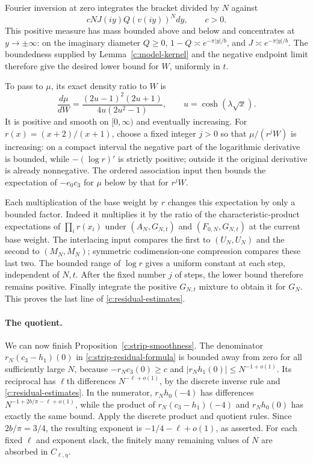 \documentclass[11pt]{article}
\numberwithin{equation}{section}
\theoremstyle{definition}\newtheorem{definition}[theorem]{Definition}
\theoremstyle{remark}\newtheorem{remark}[theorem]{Remark}
\begin{document}
Fourier inversion at zero integrates the bracket divided by $N$ against
\[
 cNJ(iy)Q(v(iy))^Ndy,\qquad c>0.
\]
This positive measure has mass bounded above and below and concentrates
at $y\to\pm\infty$: on the imaginary diameter $Q\ge0$,
$1-Q\asymp e^{-\pi|y|/b}$, and
$J\asymp e^{-\pi|y|/b}$.
The boundedness supplied by Lemma~\ref{c:model-kernel} and the negative
endpoint limit therefore give the desired lower bound for $W$,
uniformly in $t$.

To pass to $\mu$, its exact density ratio to $W$ is
\[
 \frac{d\mu}{dW}
 =\frac{(2u-1)^2(2u+1)}{4u(2u^2-1)},
 \qquad u=\cosh(\lambda\sqrt x).
\]
It is positive and smooth on $[0,\infty)$ and eventually increasing.
For $r(x)=(x+2)/(x+1)$, choose a fixed integer $j>0$ so that
$\mu/(r^jW)$ is increasing: on a compact interval the negative part
of the logarithmic derivative is bounded, while
$-(\log r)'$ is strictly positive; outside it the original derivative
is already nonnegative.  The ordered association input then bounds
the expectation of $-e_0c_3$ for $\mu$ below by that for $r^jW$.

Each multiplication of the base weight by $r$ changes this expectation
by only a bounded factor.  Indeed it multiplies it by the ratio of the
characteristic-product expectations of $\prod_i r(x_i)$ under
$(A_N,G_{N,t})$ and $(F_{0,N},G_{N,t})$ at the current base weight.
The interlacing input compares the first to $(U_N,U_N)$ and the second
to $(M_N,M_N)$; symmetric codimension-one compression compares these
last two.  The bounded range of $\log r$ gives a uniform constant at
each step, independent of $N,t$.  After the fixed number $j$ of steps,
the lower bound therefore remains positive.  Finally integrate the
positive $G_{N,t}$ mixture to obtain it for $G_N$.
This proves the last line of \eqref{c:residual-estimates}.

\paragraph{The quotient.}
We can now finish Proposition~\ref{c:strip-smoothness}.
The denominator $r_N(c_3-h_1)(0)$ in
\eqref{c:strip-residual-formula} is bounded away from zero for all
sufficiently large $N$, because
$-r_Nc_3(0)\ge c$ and $|r_Nh_1(0)|\le N^{-1+o(1)}$.
Its reciprocal has $\ell$th differences $N^{-\ell+o(1)}$, by the
discrete inverse rule and \eqref{c:residual-estimates}.  In the
numerator, $r_Nh_0(-4)$ has differences
$N^{-1+2b/\pi-\ell+o(1)}$, while the product of
$r_N(c_3-h_1)(-4)$ and $r_Nh_0(0)$ has exactly the same bound.
Apply the discrete product and quotient rules.  Since
$2b/\pi=3/4$, the resulting exponent is $-1/4-\ell+o(1)$,
as asserted.  For each fixed $\ell$ and exponent slack, the finitely
many remaining values of $N$ are absorbed in $C_{\ell,\eta}$.
\end{document}
